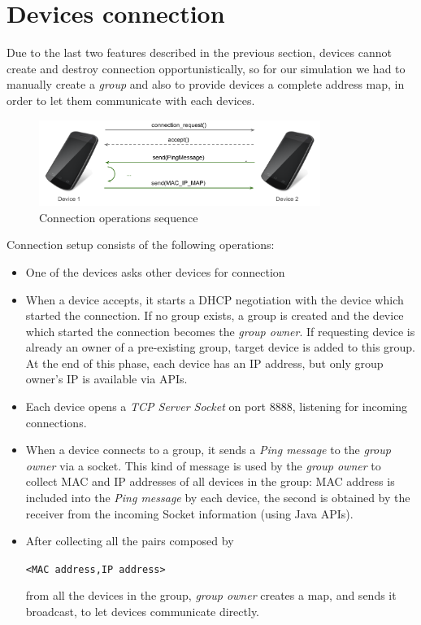 \section{Devices connection}

Due to the last two \direct features described in the previous section, devices cannot create and destroy connection opportunistically, so for our simulation we had to 
manually create a \direct \textit{group} and also to provide devices a complete address map, in order to let them communicate with each
devices.

\begin{figure}[!htbp]
\centering
\includegraphics[width=3.6in]{imgs/device_connection_ops.pdf}
\caption{Connection operations sequence}
\label{fig:device_connection}
\end{figure}

Connection setup consists of the following operations:
	\begin{itemize}
		\item One of the devices asks other devices for connection
		\item When a device accepts, it starts a DHCP negotiation with the device which started the connection. If no \direct group exists, a group is created and the device which started the connection becomes the \textit{group owner}. If requesting device is already an owner of a pre-existing group, target device is added to this group. At the end of this phase, each device has an IP address, but only group owner's IP is available via \direct APIs. 
		\item Each device opens a \textit{TCP Server Socket} on port 8888, listening for incoming connections.
		\item When a device connects to a group, it sends a \textit{Ping message} to the \textit{group owner} via a socket. This kind of message is used by the \textit{group owner} to collect MAC and IP addresses of all devices in the group: MAC address is included into the \emph{Ping message} by each device, the second is obtained by the receiver from the incoming Socket information (using Java APIs).
		\item After collecting all the pairs composed by \begin{center}\tt{<MAC address,IP address>}\end{center} from all the devices in the group, \textit{group owner} creates a map, and sends it broadcast, to let devices communicate directly.
	\end{itemize}

